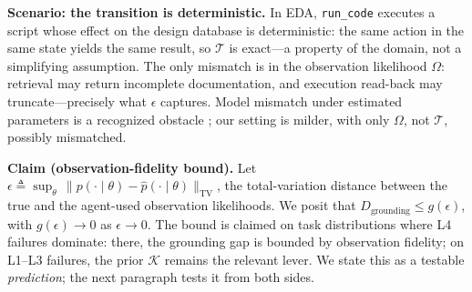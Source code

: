 \textbf{Scenario: the transition is deterministic.} In EDA, \texttt{run\_code} executes a script whose effect on the design database is deterministic: the same action in the same state yields the same result, so $\mathcal{T}$ is exact---a property of the domain, not a simplifying assumption. The only mismatch is in the observation likelihood $\Omega$: retrieval may return incomplete documentation, and execution read-back may truncate---precisely what $\epsilon$ captures. Model mismatch under estimated parameters is a recognized obstacle \cite{delage2010percentile}; our setting is milder, with only $\Omega$, not $\mathcal{T}$, possibly mismatched.

\textbf{Claim (observation-fidelity bound).} Let $\epsilon \triangleq \sup_{\theta}\, \| p(\cdot\mid\theta) - \hat{p}(\cdot\mid\theta) \|_{\mathrm{TV}}$, the total-variation distance between the true and the agent-used observation likelihoods. We posit that $D_{\text{grounding}} \le g(\epsilon)$, with $g(\epsilon)\to 0$ as $\epsilon\to 0$. The bound is claimed on task distributions where L4 failures dominate: there, the grounding gap is bounded by observation fidelity; on L1--L3 failures, the prior $\mathcal{K}$ remains the relevant lever. We state this as a testable \emph{prediction}; the next paragraph tests it from both sides.

